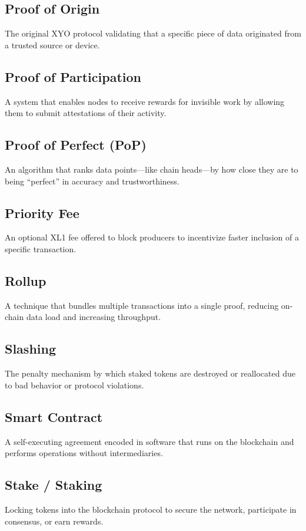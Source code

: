 \documentclass{article}
\begin{document}
\subsection*{Proof of Origin}
The original XYO protocol validating that a specific piece of data originated
from a trusted source or device.

\subsection*{Proof of Participation}
A system that enables nodes to receive rewards for invisible work by allowing
them to submit attestations of their activity.

\subsection*{Proof of Perfect (PoP)}
An algorithm that ranks data points—like chain heads—by how close they are to
being “perfect” in accuracy and trustworthiness.

\subsection*{Priority Fee}
An optional XL1 fee offered to block producers to incentivize faster inclusion
of a specific transaction.

\subsection*{Rollup}
A technique that bundles multiple transactions into a single proof, reducing
on-chain data load and increasing throughput.

\subsection*{Slashing}
The penalty mechanism by which staked tokens are destroyed or reallocated due
to bad behavior or protocol violations.

\subsection*{Smart Contract}
A self-executing agreement encoded in software that runs on the blockchain and
performs operations without intermediaries.

\subsection*{Stake / Staking}
Locking tokens into the blockchain protocol to secure the network, participate
in consensus, or earn rewards.
\end{document}
